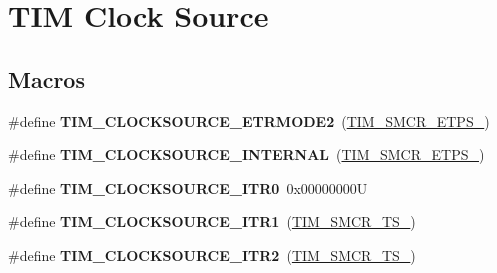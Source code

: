 \hypertarget{group___t_i_m___clock___source}{}\section{T\+IM Clock Source}
\label{group___t_i_m___clock___source}
\subsection*{Macros}
\begin{DoxyCompactItemize}
\item 
\mbox{\label{group___t_i_m___clock___source_gab133f0839cf6a4e858457d48f057eea8}} 
\#define {\bfseries T\+I\+M\+\_\+\+C\+L\+O\+C\+K\+S\+O\+U\+R\+C\+E\+\_\+\+E\+T\+R\+M\+O\+D\+E2}~(\mbox{\hyperlink{group___peripheral___registers___bits___definition_gabf12f04862dbc92ca238d1518b27b16b}{T\+I\+M\+\_\+\+S\+M\+C\+R\+\_\+\+E\+T\+P\+S\+\_}})
\item 
\mbox{\label{group___t_i_m___clock___source_ga9b398a201d8b6a4f200ebde86b1d8f3a}} 
\#define {\bfseries T\+I\+M\+\_\+\+C\+L\+O\+C\+K\+S\+O\+U\+R\+C\+E\+\_\+\+I\+N\+T\+E\+R\+N\+AL}~(\mbox{\hyperlink{group___peripheral___registers___bits___definition_ga00b43cd09557a69ed10471ed76b228d8}{T\+I\+M\+\_\+\+S\+M\+C\+R\+\_\+\+E\+T\+P\+S\+\_}})
\item 
\mbox{\label{group___t_i_m___clock___source_ga3310aa84f2f322eb77538997c070e56a}} 
\#define {\bfseries T\+I\+M\+\_\+\+C\+L\+O\+C\+K\+S\+O\+U\+R\+C\+E\+\_\+\+I\+T\+R0}~0x00000000U
\item 
\mbox{\label{group___t_i_m___clock___source_gae2da814f8d86491e7c344bb8d0f62b96}} 
\#define {\bfseries T\+I\+M\+\_\+\+C\+L\+O\+C\+K\+S\+O\+U\+R\+C\+E\+\_\+\+I\+T\+R1}~(\mbox{\hyperlink{group___peripheral___registers___bits___definition_ga8d1f040f9259acb3c2fba7b0c7eb3d96}{T\+I\+M\+\_\+\+S\+M\+C\+R\+\_\+\+T\+S\+\_}})
\item 
\mbox{\label{group___t_i_m___clock___source_gafb779719a41769b14303da4977f6a5f1}} 
\#define {\bfseries T\+I\+M\+\_\+\+C\+L\+O\+C\+K\+S\+O\+U\+R\+C\+E\+\_\+\+I\+T\+R2}~(\mbox{\hyperlink{group___peripheral___registers___bits___definition_gacb82212fcc89166a43ff97542da9182d}{T\+I\+M\+\_\+\+S\+M\+C\+R\+\_\+\+T\+S\+\_}})

\end{DoxyCompactItemize}
